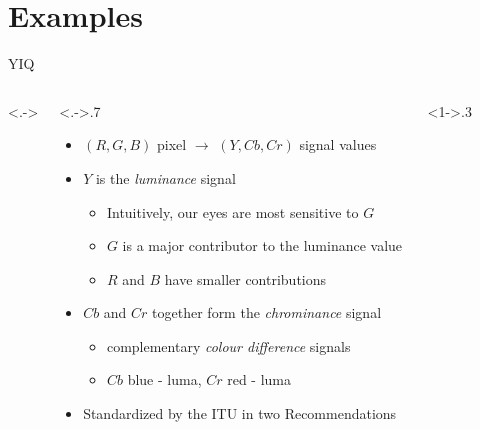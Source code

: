 \documentclass[aspectratio=169,handout,usepdftitle=false]{fireshonks}
\begin{document}
\section{Examples}
\begin{frame}{YIQ}
    \begin{columns}<.->
        \begin{column}<.->{.7\textwidth}
            \begin{itemize}
                \item $(R, G, B)$ pixel $\rightarrow$ $(Y, Cb, Cr)$ signal values
                \item $Y$ is the \emph{luminance} signal
                      \begin{itemize}
                          \item Intuitively, our eyes are most sensitive to $G$
                          \item $G$ is a major contributor to the luminance value
                          \item $R$ and $B$ have smaller contributions
                      \end{itemize}
                \item $Cb$ and $Cr$ together form the \emph{chrominance} signal
                      \begin{itemize}
                          \item complementary \emph{colour difference} signals
                          \item $Cb$ blue - luma, $Cr$ red - luma
                      \end{itemize}
                \item Standardized by the ITU in two Recommendations
            \end{itemize}
        \end{column}
        \begin{column}<1->{.3\textwidth}
            \begin{figure}

\end{figure}
\end{column}
\end{columns}
\end{frame}
\end{document}
